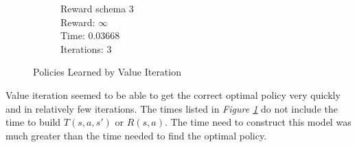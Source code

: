 \documentclass[a4paper,10pt]{article}
\begin{document}
\begin{figure}[H]
\begin{subfigure}[b]{0.3\textwidth}
                \caption{Reward schema 3\\
                Reward: $\infty$  \\
                Time:  0.03668\\
                Iterations: 3}
                \label{fig:v6}
        \end{subfigure}
        \caption{Policies Learned by Value Iteration}\label{fig:animals}
\end{figure}

Value iteration seemed to be able to get the correct optimal policy very quickly and in relatively few iterations. The times listed in \textit{Figure \ref{fig:v6}} do not include the time to build $T(s, a, s')$ or $R(s, a)$. The time need to construct this model was much greater than the time needed to find the optimal policy.
\end{document}
